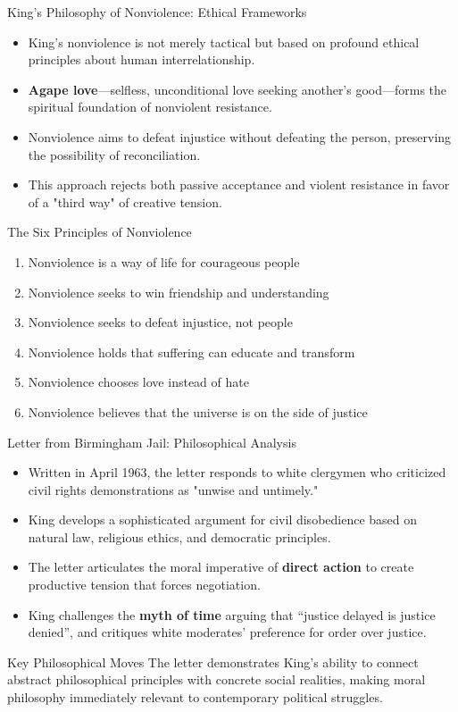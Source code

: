 \documentclass{beamer}
\begin{document}
	\begin{frame}{King's Philosophy of Nonviolence: Ethical Frameworks}
		\begin{itemize}
			\item King's nonviolence is not merely tactical but based on profound ethical principles about human interrelationship.
			\item \textbf{Agape love}—selfless, unconditional love seeking another's good—forms the spiritual foundation of nonviolent resistance.
			\item Nonviolence aims to defeat injustice without defeating the person, preserving the possibility of reconciliation.
			\item This approach rejects both passive acceptance and violent resistance in favor of a "third way" of creative tension.
		\end{itemize}
		
		\begin{alertblock}{The Six Principles of Nonviolence}
			\scriptsize
			\begin{enumerate}
				\item Nonviolence is a way of life for courageous people
				\item Nonviolence seeks to win friendship and understanding
				\item Nonviolence seeks to defeat injustice, not people
				\item Nonviolence holds that suffering can educate and transform
				\item Nonviolence chooses love instead of hate
				\item Nonviolence believes that the universe is on the side of justice
			\end{enumerate}
		\end{alertblock}
	\end{frame}
	
	\begin{frame}{Letter from Birmingham Jail: Philosophical Analysis}
		\begin{itemize}
			\item Written in April 1963, the letter responds to white clergymen who criticized civil rights demonstrations as "unwise and untimely."
			\item King develops a sophisticated argument for civil disobedience based on natural law, religious ethics, and democratic principles.
			\item The letter articulates the moral imperative of \textbf{direct action} to create productive tension that forces negotiation.
			\item King challenges the \textbf{myth of time} arguing that ``justice delayed is justice denied'', and critiques white moderates' preference for order over justice.
		\end{itemize}
		
		\begin{block}{Key Philosophical Moves}
			The letter demonstrates King's ability to connect abstract philosophical principles with concrete social realities, making moral philosophy immediately relevant to contemporary political struggles.
		\end{block}
	\end{frame}
	
\end{document}
